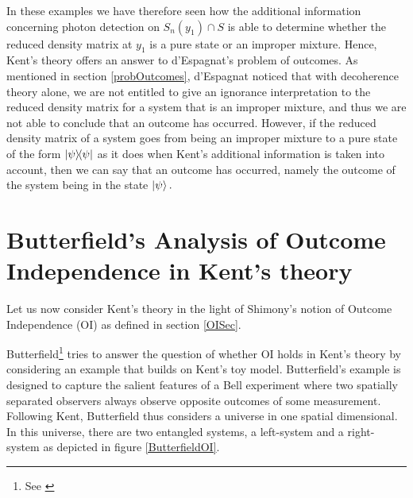 In these examples we have therefore seen how the additional information concerning photon detection on $S_n(y_1)\cap S$ is able to determine whether the reduced density matrix at $y_1$ is a pure state or an improper mixture. Hence, Kent's theory offers an answer to d'Espagnat's problem of outcomes. As mentioned in section \ref{probOutcomes}, d'Espagnat noticed that with decoherence theory alone, we are not entitled to give an ignorance interpretation to the reduced density matrix for a system that is an improper mixture, and thus we are not able to conclude that an outcome has occurred. However, if the reduced density matrix of a system goes from being an improper mixture to a pure state of the form $\dyad{\psi}$ as it does when Kent's additional information is taken into account, then we can say that an outcome has occurred, namely the outcome of the system being in the state $\ket{\psi}.$  




\section{Butterfield's Analysis of Outcome Independence  in Kent's theory\label{butterfieldtoy}}
Let us now consider Kent's theory in the light of Shimony's notion of Outcome Independence (OI)  as defined in section \ref{OISec}. 

Butterfield\footnote{See \cite[30-32]{Butterfield}} tries to answer the question of whether OI holds in Kent's theory by considering an example that builds on Kent's toy model. Butterfield's example is designed to capture the salient features of a Bell experiment where two spatially separated observers always observe opposite outcomes of some measurement. Following Kent, Butterfield thus considers a universe in one spatial dimensional. In this universe, there are two entangled systems, a left-system and a right-system as depicted in figure \ref{ButterfieldOI}. 

